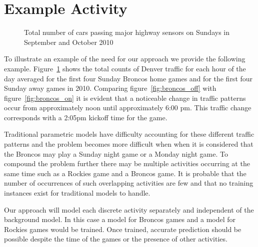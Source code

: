 

\section{Example Activity}

\begin{figure}[ht]
\begin{center}
\end{center}
\caption{Total number of cars passing major highway sensors on Sundays in September and October 2010}
\label{fig:broncos}
\end{figure}

To illustrate an example of the need for our approach we provide the following example.  Figure~\ref{fig:broncos} shows the total counts of Denver traffic for each hour of the day averaged for the first four Sunday Broncos home games and for the first four Sunday away games in 2010.  Comparing figure~\ref{fig:broncos_off} with figure~\ref{fig:broncos_on} it is evident that a noticeable change in traffic patterns occur from approximately noon until approximately 6:00 pm.  This traffic change corresponds with a 2:05pm kickoff time for the game. 

Traditional parametric models have difficulty accounting for these different traffic patterns and the problem becomes more difficult when when it is considered that the Broncos may play a Sunday night game or a Monday night game.  To compound the problem further there may be multiple activities occurring at the same time such as a Rockies game and a Broncos game.  It is probable that the number of occurrences of such overlapping activities are few and that no training instances exist for traditional models to handle.  

Our approach will model each discrete activity separately and independent of the background model.  In this case a model for Broncos games and a model for Rockies games would be trained.  Once trained, accurate prediction should be possible despite the time of the games or the presence of other activities.

